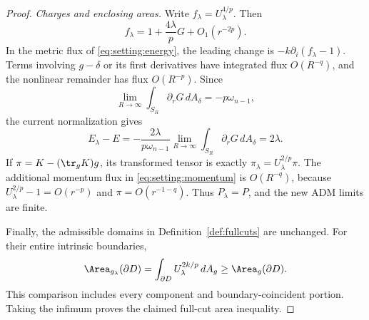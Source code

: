 \begin{proof}
\emph{Charges and enclosing areas.} Write $f_\lambda=U_\lambda^{4/p}$.
Then
\[
 f_\lambda=1+\frac{4\lambda}{p}G+O_1(r^{-2p}).
\]
In the metric flux of \eqref{eq:setting:energy}, the leading
change is $-k\partial_i(f_\lambda-1)$. Terms involving $g-\delta$ or
its first derivatives have integrated flux $O(R^{-q})$, and the nonlinear
remainder has flux $O(R^{-p})$. Since
\[
 \lim_{R\to\infty}\int_{S_R}\partial_rG\,dA_\delta
 =-p\omega_{n-1},
\]
the current normalization gives
\[
 E_\lambda-E
 =-\frac{2\lambda}{p\omega_{n-1}}
   \lim_{R\to\infty}\int_{S_R}\partial_rG\,dA_\delta
 =2\lambda.
\]
If $\pi=K-(\tr_gK)g$, its transformed tensor is exactly
$\pi_\lambda=U_\lambda^{2/p}\pi$. The additional momentum flux in
\eqref{eq:setting:momentum} is $O(R^{-q})$, because
$U_\lambda^{2/p}-1=O(r^{-p})$ and $\pi=O(r^{-1-q})$.
Thus $P_\lambda=P$, and the new ADM limits are finite.

Finally, the admissible domains in Definition~\ref{def:fullcuts} are
unchanged. For their entire intrinsic boundaries,
\[
 \Area_{g_\lambda}(\partial D)
 =\int_{\partial D}U_\lambda^{2k/p}\,dA_g
 \ge \Area_g(\partial D).
\]
This comparison includes every component and boundary-coincident portion.
Taking the infimum proves the claimed full-cut area inequality.
\end{proof}
